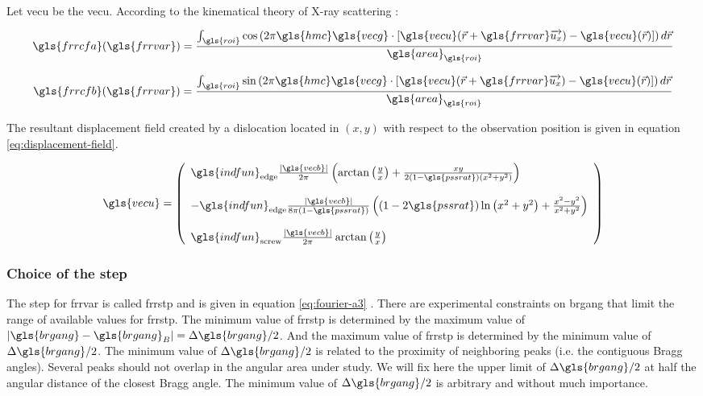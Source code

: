 Let \gls{vecu} be the \glsdesc{vecu}.
According to the kinematical theory of X-ray scattering \cite{W1990}:

\begin{equation}\label{eq:fourier-a-warren}
\gls{frrcfa}(\gls{frrvar}) = \frac{\int_{\gls{roi}} \cos \left( 2 \pi \gls{hmc} \gls{vecg} \cdot \left[ \gls{vecu}(\vec{r} + \gls{frrvar} \overrightarrow{u_x}) - \gls{vecu}(\vec{r}) \right] \right) d\vec{r}}{\gls{area}_{\gls{roi}}}
\end{equation}

\begin{equation}\label{eq:fourier-b-warren}
\gls{frrcfb}(\gls{frrvar}) = \frac{\int_{\gls{roi}} \sin \left( 2 \pi \gls{hmc} \gls{vecg} \cdot \left[ \gls{vecu}(\vec{r} + \gls{frrvar} \overrightarrow{u_x}) - \gls{vecu}(\vec{r}) \right] \right) d\vec{r}}{\gls{area}_{\gls{roi}}}
\end{equation}

\medskip

The resultant displacement field created by a dislocation located in \( ( x, y ) \) with respect to the observation position is given in equation \eqref{eq:displacement-field}.

\begin{align}\label{eq:displacement-field}
\gls{vecu} =
  \left( \begin{array}{l}
    \gls{indfun}_{\mathrm{edge}} \frac{| \gls{vecb} |}{2 \pi} \left( \arctan \left( \frac{y}{x} \right) + \frac{x y}{2 (1 - \gls{pssrat}) \left( x^2 + y^2 \right)} \right)
    \\[5mm]
    - \gls{indfun}_{\mathrm{edge}} \frac{| \gls{vecb} |}{8 \pi (1 - \gls{pssrat})} \left( (1 - 2 \gls{pssrat}) \ln \left( x^2 + y^2 \right) + \frac{x^2 - y^2}{x^2 + y^2} \right)
    \\[5mm]
    \gls{indfun}_{\mathrm{screw}} \frac{| \gls{vecb} |}{2 \pi} \arctan \left( \frac{y}{x} \right)
  \end{array} \right)
\end{align}

\subsubsection{Choice of the step}

The step for \gls{frrvar} is called \gls{frrstp} and is given in equation \eqref{eq:fourier-a3} \cite{W1990}.
There are experimental constraints on \gls{brgang} that limit the range of available values for \gls{frrstp}.
The minimum value of \gls{frrstp} is determined by the maximum value of \( | \gls{brgang} - \gls{brgang}_B | = \Delta \gls{brgang} / 2 \).
And the maximum value of \gls{frrstp} is determined by the minimum value of \( \Delta \gls{brgang} / 2 \).
The minimum value of \( \Delta \gls{brgang} / 2 \) is related to the proximity of neighboring peaks (i.e. the contiguous Bragg angles).
Several peaks should not overlap in the angular area under study.
We will fix here the upper limit of \( \Delta \gls{brgang} / 2 \) at half the angular distance of the closest Bragg angle.
The minimum value of \( \Delta \gls{brgang} / 2 \) is arbitrary and without much importance.

